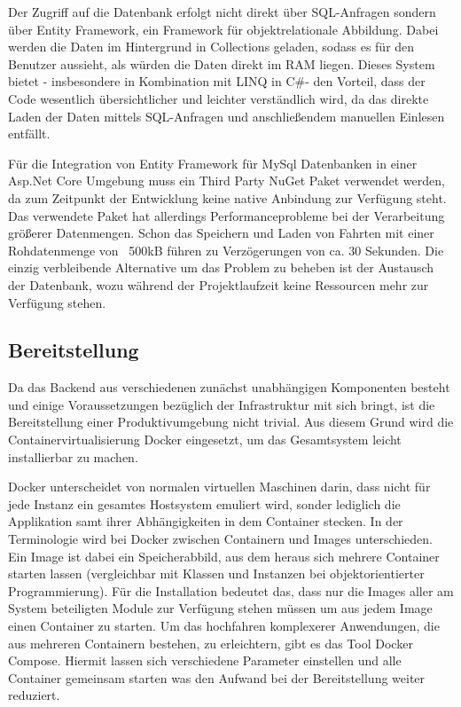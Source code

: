 Der Zugriff auf die Datenbank erfolgt nicht direkt über SQL-Anfragen sondern über Entity Framework, ein Framework für objektrelationale Abbildung. Dabei werden die Daten im Hintergrund in Collections geladen, sodass es für den Benutzer aussieht, als würden die Daten direkt im RAM liegen. Dieses System bietet - insbesondere in Kombination mit \ac{LINQ} in C\#- den Vorteil, dass der Code wesentlich übersichtlicher und leichter verständlich wird, da das direkte Laden der Daten mittels SQL-Anfragen und anschließendem manuellen Einlesen entfällt.

Für die Integration von Entity Framework für MySql Datenbanken in einer Asp.Net Core Umgebung muss ein Third Party NuGet Paket\cite{Microsoft2018} verwendet werden, da zum Zeitpunkt der Entwicklung keine native Anbindung zur Verfügung steht. Das verwendete Paket hat allerdings Performanceprobleme bei der Verarbeitung größerer Datenmengen. Schon das Speichern und Laden von Fahrten mit einer Rohdatenmenge von ~500kB führen zu Verzögerungen von ca. 30 Sekunden. Die einzig verbleibende Alternative um das Problem zu beheben ist der Austausch der Datenbank, wozu während der Projektlaufzeit keine Ressourcen mehr zur Verfügung stehen.

\subsection{Bereitstellung}
\label{sec:backendDeployment}
Da das Backend aus verschiedenen zunächst unabhängigen Komponenten besteht und einige Voraussetzungen bezüglich der Infrastruktur mit sich bringt, ist die Bereitstellung einer Produktivumgebung nicht trivial. 
Aus diesem Grund wird die Containervirtualisierung Docker eingesetzt, um das Gesamtsystem leicht installierbar zu machen.

Docker\cite{Inc.2018} unterscheidet von normalen virtuellen Maschinen darin, dass nicht für jede Instanz ein gesamtes Hostsystem emuliert wird, sonder lediglich die Applikation samt ihrer Abhängigkeiten in dem Container stecken. In der Terminologie wird bei Docker zwischen Containern und Images unterschieden. Ein Image ist dabei ein Speicherabbild, aus dem heraus sich mehrere Container starten lassen (vergleichbar mit Klassen und Instanzen bei objektorientierter Programmierung). Für die Installation bedeutet das, dass nur die Images aller am System beteiligten Module zur Verfügung stehen müssen um aus jedem Image einen Container zu starten. Um das hochfahren komplexerer Anwendungen, die aus mehreren Containern bestehen, zu erleichtern, gibt es das Tool Docker Compose. Hiermit lassen sich verschiedene Parameter einstellen und alle Container gemeinsam starten was den Aufwand bei der Bereitstellung weiter reduziert. 

